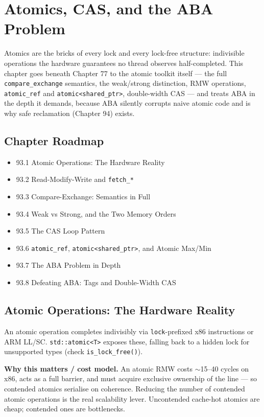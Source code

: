 \chapter{Atomics, CAS, and the ABA Problem}

Atomics are the bricks of every lock and every lock-free structure: indivisible operations the hardware guarantees no thread observes half-completed. This chapter goes beneath Chapter 77 to the atomic toolkit itself --- the full \texttt{compare\_exchange} semantics, the weak/strong distinction, RMW operations, \texttt{atomic\_ref} and \texttt{atomic<shared\_ptr>}, double-width CAS --- and treats ABA in the depth it demands, because ABA silently corrupts naive atomic code and is why safe reclamation (Chapter 94) exists.

\section*{Chapter Roadmap}
\begin{itemize}
\item 93.1 Atomic Operations: The Hardware Reality
\item 93.2 Read-Modify-Write and \texttt{fetch\_*}
\item 93.3 Compare-Exchange: Semantics in Full
\item 93.4 Weak vs Strong, and the Two Memory Orders
\item 93.5 The CAS Loop Pattern
\item 93.6 \texttt{atomic\_ref}, \texttt{atomic<shared\_ptr>}, and Atomic Max/Min
\item 93.7 The ABA Problem in Depth
\item 93.8 Defeating ABA: Tags and Double-Width CAS
\end{itemize}

\section{Atomic Operations: The Hardware Reality}
An atomic operation completes indivisibly via \texttt{lock}-prefixed x86 instructions or ARM LL/SC. \texttt{std::atomic<T>} exposes these, falling back to a hidden lock for unsupported types (check \texttt{is\_lock\_free()}).

\textbf{Why this matters / cost model.} An atomic RMW costs $\sim$15--40 cycles on x86, acts as a full barrier, and must acquire exclusive ownership of the line --- so contended atomics serialise on coherence. Reducing the number of contended atomic operations is the real scalability lever. Uncontended cache-hot atomics are cheap; contended ones are bottlenecks.

